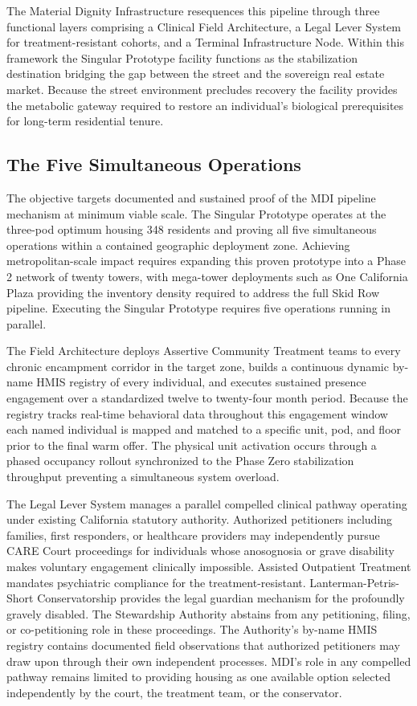\documentclass[12pt, letterpaper]{article}
\begin{document}
The Material Dignity Infrastructure resequences this pipeline through three functional layers comprising a Clinical Field Architecture, a Legal Lever System for treatment-resistant cohorts, and a Terminal Infrastructure Node. Within this framework the Singular Prototype facility functions as the stabilization destination bridging the gap between the street and the sovereign real estate market. Because the street environment precludes recovery the facility provides the metabolic gateway required to restore an individual's biological prerequisites for long-term residential tenure.

\subsection{The Five Simultaneous Operations}

The objective targets documented and sustained proof of the MDI pipeline mechanism at minimum viable scale. The Singular Prototype operates at the three-pod optimum housing 348 residents and proving all five simultaneous operations within a contained geographic deployment zone. Achieving metropolitan-scale impact requires expanding this proven prototype into a Phase 2 network of twenty towers, with mega-tower deployments such as One California Plaza providing the inventory density required to address the full Skid Row pipeline. Executing the Singular Prototype requires five operations running in parallel.

The Field Architecture deploys Assertive Community Treatment teams to every chronic encampment corridor in the target zone, builds a continuous dynamic by-name HMIS registry of every individual, and executes sustained presence engagement over a standardized twelve to twenty-four month period. Because the registry tracks real-time behavioral data throughout this engagement window each named individual is mapped and matched to a specific unit, pod, and floor prior to the final warm offer. The physical unit activation occurs through a phased occupancy rollout synchronized to the Phase Zero stabilization throughput preventing a simultaneous system overload.

The Legal Lever System manages a parallel compelled clinical pathway operating under existing California statutory authority. Authorized petitioners including families, first responders, or healthcare providers may independently pursue CARE Court proceedings for individuals whose anosognosia or grave disability makes voluntary engagement clinically impossible. Assisted Outpatient Treatment mandates psychiatric compliance for the treatment-resistant. Lanterman-Petris-Short Conservatorship provides the legal guardian mechanism for the profoundly gravely disabled. The Stewardship Authority abstains from any petitioning, filing, or co-petitioning role in these proceedings. The Authority's by-name HMIS registry contains documented field observations that authorized petitioners may draw upon through their own independent processes. MDI's role in any compelled pathway remains limited to providing housing as one available option selected independently by the court, the treatment team, or the conservator.
\end{document}
